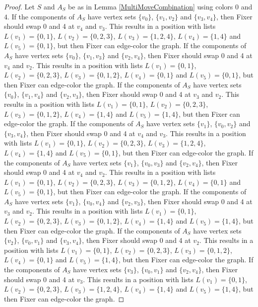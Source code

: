 \documentclass[12pt]{amsart}
\theoremstyle{plain}
\theoremstyle{definition}
\theoremstyle{remark}
\begin{document}
\begin{proof}
Let $S$ and $A_S$ be as in Lemma \ref{MultiMoveCombination} using colors $0$ and $4$. If the components of $A_S$ have vertex sets $\{v_0\}$, $\{v_1, v_2\}$ and $\{v_3, v_4\}$, then Fixer should swap 0 and 4 at $v_4$ and $v_3$. This results in a position with lists $L(v_1) = \{0, 1\}$, $L(v_2) = \{0, 2, 3\}$, $L(v_3) = \{1, 2, 4\}$, $L(v_4) = \{1, 4\}$ and $L(v_5) = \{0, 1\}$, but then Fixer can edge-color the graph.
If the components of $A_S$ have vertex sets $\{v_0\}$, $\{v_1, v_3\}$ and $\{v_2, v_4\}$, then Fixer should swap 0 and 4 at $v_4$ and $v_2$. This results in a position with lists $L(v_1) = \{0, 1\}$, $L(v_2) = \{0, 2, 3\}$, $L(v_3) = \{0, 1, 2\}$, $L(v_4) = \{0, 1\}$ and $L(v_5) = \{0, 1\}$, but then Fixer can edge-color the graph.
If the components of $A_S$ have vertex sets $\{v_0\}$, $\{v_1, v_4\}$ and $\{v_2, v_3\}$, then Fixer should swap 0 and 4 at $v_3$ and $v_2$. This results in a position with lists $L(v_1) = \{0, 1\}$, $L(v_2) = \{0, 2, 3\}$, $L(v_3) = \{0, 1, 2\}$, $L(v_4) = \{1, 4\}$ and $L(v_5) = \{1, 4\}$, but then Fixer can edge-color the graph.
If the components of $A_S$ have vertex sets $\{v_1\}$, $\{v_0, v_2\}$ and $\{v_3, v_4\}$, then Fixer should swap 0 and 4 at $v_4$ and $v_3$. This results in a position with lists $L(v_1) = \{0, 1\}$, $L(v_2) = \{0, 2, 3\}$, $L(v_3) = \{1, 2, 4\}$, $L(v_4) = \{1, 4\}$ and $L(v_5) = \{0, 1\}$, but then Fixer can edge-color the graph.
If the components of $A_S$ have vertex sets $\{v_1\}$, $\{v_0, v_3\}$ and $\{v_2, v_4\}$, then Fixer should swap 0 and 4 at $v_4$ and $v_2$. This results in a position with lists $L(v_1) = \{0, 1\}$, $L(v_2) = \{0, 2, 3\}$, $L(v_3) = \{0, 1, 2\}$, $L(v_4) = \{0, 1\}$ and $L(v_5) = \{0, 1\}$, but then Fixer can edge-color the graph.
If the components of $A_S$ have vertex sets $\{v_1\}$, $\{v_0, v_4\}$ and $\{v_2, v_3\}$, then Fixer should swap 0 and 4 at $v_3$ and $v_2$. This results in a position with lists $L(v_1) = \{0, 1\}$, $L(v_2) = \{0, 2, 3\}$, $L(v_3) = \{0, 1, 2\}$, $L(v_4) = \{1, 4\}$ and $L(v_5) = \{1, 4\}$, but then Fixer can edge-color the graph.
If the components of $A_S$ have vertex sets $\{v_2\}$, $\{v_0, v_1\}$ and $\{v_3, v_4\}$, then Fixer should swap 0 and 4 at $v_2$. This results in a position with lists $L(v_1) = \{0, 1\}$, $L(v_2) = \{0, 2, 3\}$, $L(v_3) = \{0, 1, 2\}$, $L(v_4) = \{0, 1\}$ and $L(v_5) = \{1, 4\}$, but then Fixer can edge-color the graph.
If the components of $A_S$ have vertex sets $\{v_3\}$, $\{v_0, v_1\}$ and $\{v_2, v_4\}$, then Fixer should swap 0 and 4 at $v_3$. This results in a position with lists $L(v_1) = \{0, 1\}$, $L(v_2) = \{0, 2, 3\}$, $L(v_3) = \{1, 2, 4\}$, $L(v_4) = \{1, 4\}$ and $L(v_5) = \{1, 4\}$, but then Fixer can edge-color the graph.

\end{proof}
\end{document}
